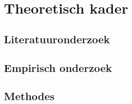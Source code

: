 \section{Theoretisch kader}
\subsection{Literatuuronderzoek}
\subsection{Empirisch onderzoek}
\subsection{Methodes}


